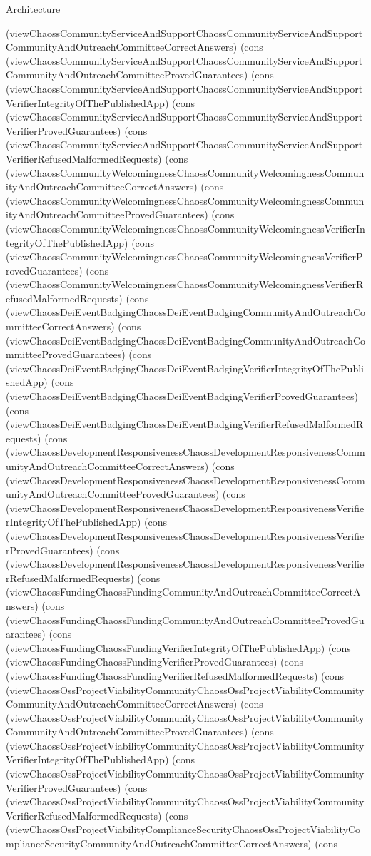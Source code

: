 \begin{lexlean}{Architecture}
\begin{semanticmodule}
{(viewChaossCommunityServiceAndSupportChaossCommunityServiceAndSupportCommunityAndOutreachCommitteeCorrectAnswers) (cons (viewChaossCommunityServiceAndSupportChaossCommunityServiceAndSupportCommunityAndOutreachCommitteeProvedGuarantees) (cons (viewChaossCommunityServiceAndSupportChaossCommunityServiceAndSupportVerifierIntegrityOfThePublishedApp) (cons (viewChaossCommunityServiceAndSupportChaossCommunityServiceAndSupportVerifierProvedGuarantees) (cons (viewChaossCommunityServiceAndSupportChaossCommunityServiceAndSupportVerifierRefusedMalformedRequests) (cons (viewChaossCommunityWelcomingnessChaossCommunityWelcomingnessCommunityAndOutreachCommitteeCorrectAnswers) (cons (viewChaossCommunityWelcomingnessChaossCommunityWelcomingnessCommunityAndOutreachCommitteeProvedGuarantees) (cons (viewChaossCommunityWelcomingnessChaossCommunityWelcomingnessVerifierIntegrityOfThePublishedApp) (cons (viewChaossCommunityWelcomingnessChaossCommunityWelcomingnessVerifierProvedGuarantees) (cons (viewChaossCommunityWelcomingnessChaossCommunityWelcomingnessVerifierRefusedMalformedRequests) (cons (viewChaossDeiEventBadgingChaossDeiEventBadgingCommunityAndOutreachCommitteeCorrectAnswers) (cons (viewChaossDeiEventBadgingChaossDeiEventBadgingCommunityAndOutreachCommitteeProvedGuarantees) (cons (viewChaossDeiEventBadgingChaossDeiEventBadgingVerifierIntegrityOfThePublishedApp) (cons (viewChaossDeiEventBadgingChaossDeiEventBadgingVerifierProvedGuarantees) (cons (viewChaossDeiEventBadgingChaossDeiEventBadgingVerifierRefusedMalformedRequests) (cons (viewChaossDevelopmentResponsivenessChaossDevelopmentResponsivenessCommunityAndOutreachCommitteeCorrectAnswers) (cons (viewChaossDevelopmentResponsivenessChaossDevelopmentResponsivenessCommunityAndOutreachCommitteeProvedGuarantees) (cons (viewChaossDevelopmentResponsivenessChaossDevelopmentResponsivenessVerifierIntegrityOfThePublishedApp) (cons (viewChaossDevelopmentResponsivenessChaossDevelopmentResponsivenessVerifierProvedGuarantees) (cons (viewChaossDevelopmentResponsivenessChaossDevelopmentResponsivenessVerifierRefusedMalformedRequests) (cons (viewChaossFundingChaossFundingCommunityAndOutreachCommitteeCorrectAnswers) (cons (viewChaossFundingChaossFundingCommunityAndOutreachCommitteeProvedGuarantees) (cons (viewChaossFundingChaossFundingVerifierIntegrityOfThePublishedApp) (cons (viewChaossFundingChaossFundingVerifierProvedGuarantees) (cons (viewChaossFundingChaossFundingVerifierRefusedMalformedRequests) (cons (viewChaossOssProjectViabilityCommunityChaossOssProjectViabilityCommunityCommunityAndOutreachCommitteeCorrectAnswers) (cons (viewChaossOssProjectViabilityCommunityChaossOssProjectViabilityCommunityCommunityAndOutreachCommitteeProvedGuarantees) (cons (viewChaossOssProjectViabilityCommunityChaossOssProjectViabilityCommunityVerifierIntegrityOfThePublishedApp) (cons (viewChaossOssProjectViabilityCommunityChaossOssProjectViabilityCommunityVerifierProvedGuarantees) (cons (viewChaossOssProjectViabilityCommunityChaossOssProjectViabilityCommunityVerifierRefusedMalformedRequests) (cons (viewChaossOssProjectViabilityComplianceSecurityChaossOssProjectViabilityComplianceSecurityCommunityAndOutreachCommitteeCorrectAnswers) (cons }
\end{semanticmodule}
\end{lexlean}
